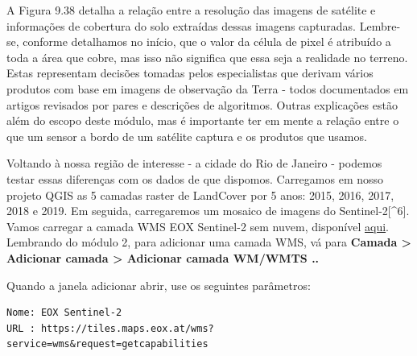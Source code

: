 \documentclass[
  portuguese,
]{krantz}
\begin{document}
A Figura 9.38 detalha a relação entre a resolução das imagens de satélite e informações de cobertura do solo extraídas dessas imagens capturadas. Lembre-se, conforme detalhamos no início, que o valor da célula de pixel é atribuído a toda a área que cobre, mas isso não significa que essa seja a realidade no terreno. Estas representam decisões tomadas pelos especialistas que derivam vários produtos com base em imagens de observação da Terra - todos documentados em artigos revisados \hspace{0pt}\hspace{0pt}por pares e descrições de algoritmos. Outras explicações estão além do escopo deste módulo, mas é importante ter em mente a relação entre o que um sensor a bordo de um satélite captura e os produtos que usamos.

Voltando à nossa região de interesse - a cidade do Rio de Janeiro - podemos testar essas diferenças com os dados de que dispomos. Carregamos em nosso projeto QGIS as 5 camadas raster de LandCover por 5 anos: 2015, 2016, 2017, 2018 e 2019. Em seguida, carregaremos um mosaico de imagens do Sentinel-2{[}\^{}6{]}. Vamos carregar a camada WMS EOX Sentinel-2 sem nuvem, disponível \href{https://s2maps.eu/}{aqui}. Lembrando do módulo 2, para adicionar uma camada WMS, vá para \textbf{Camada \textgreater{} Adicionar camada \textgreater{} Adicionar camada WM/WMTS ..}

Quando a janela adicionar abrir, use os seguintes parâmetros:

\begin{verbatim}
Nome: EOX Sentinel-2
URL : https://tiles.maps.eox.at/wms?service=wms&request=getcapabilities
\end{verbatim}
\end{document}
